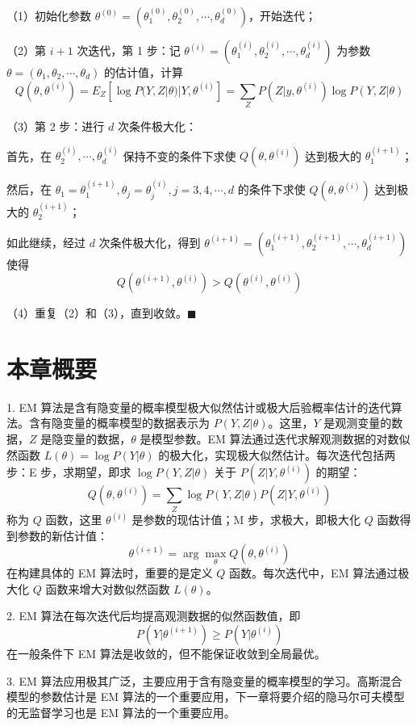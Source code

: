 \documentclass[UTF8, 12pt, fontset=fandol, oneside]{ctexart}
\begin{document}
（1）初始化参数 $\theta^{(0)}=(\theta_1^{(0)},\theta_2^{(0)},\cdots,\theta_d^{(0)})$，开始迭代；

（2）第 $i+1$ 次迭代，第 1 步：记 $\theta^{(i)}=(\theta_1^{(i)},\theta_2^{(i)},\cdots,\theta_d^{(i)})$ 为参数 $\theta=(\theta_1,\theta_2,\cdots,\theta_d)$ 的估计值，计算
\[
Q(\theta,\theta^{(i)})=E_Z[\log P(Y,Z|\theta)|Y,\theta^{(i)}]
=\sum_ZP(Z|y,\theta^{(i)})\log P(Y,Z|\theta)
\]

（3）第 2 步：进行 $d$ 次条件极大化：

首先，在 $\theta_2^{(i)},\cdots,\theta_d^{(i)}$ 保持不变的条件下求使 $Q(\theta,\theta^{(i)})$ 达到极大的 $\theta_1^{(i+1)}$；

然后，在 $\theta_1=\theta_1^{(i+1)},\theta_j=\theta_j^{(i)},j=3,4,\cdots,d$ 的条件下求使 $Q(\theta,\theta^{(i)})$ 达到极大的 $\theta_2^{(i+1)}$；

如此继续，经过 $d$ 次条件极大化，得到 $\theta^{(i+1)}=(\theta_1^{(i+1)},\theta_2^{(i+1)},\cdots,\theta_d^{(i+1)})$ 使得
\[
Q(\theta^{(i+1)},\theta^{(i)})>Q(\theta^{(i)},\theta^{(i)})
\]

（4）重复（2）和（3），直到收敛。\hfill$\blacksquare$

\section*{本章概要}

1. EM 算法是含有隐变量的概率模型极大似然估计或极大后验概率估计的迭代算法。含有隐变量的概率模型的数据表示为 $P(Y,Z|\theta)$。这里，$Y$ 是观测变量的数据，$Z$ 是隐变量的数据，$\theta$ 是模型参数。EM 算法通过迭代求解观测数据的对数似然函数 $L(\theta)=\log P(Y|\theta)$ 的极大化，实现极大似然估计。每次迭代包括两步：E 步，求期望，即求 $\log P(Y,Z|\theta)$ 关于 $P(Z|Y,\theta^{(i)})$ 的期望：
\[
Q(\theta,\theta^{(i)})=\sum_Z\log P(Y,Z|\theta)P(Z|Y,\theta^{(i)})
\]
称为 $Q$ 函数，这里 $\theta^{(i)}$ 是参数的现估计值；M 步，求极大，即极大化 $Q$ 函数得到参数的新估计值：
\[
\theta^{(i+1)}=\arg\max_\theta Q(\theta,\theta^{(i)})
\]
在构建具体的 EM 算法时，重要的是定义 $Q$ 函数。每次迭代中，EM 算法通过极大化 $Q$ 函数来增大对数似然函数 $L(\theta)$。

2. EM 算法在每次迭代后均提高观测数据的似然函数值，即
\[
P(Y|\theta^{(i+1)})\geqslant P(Y|\theta^{(i)})
\]
在一般条件下 EM 算法是收敛的，但不能保证收敛到全局最优。

3. EM 算法应用极其广泛，主要应用于含有隐变量的概率模型的学习。高斯混合模型的参数估计是 EM 算法的一个重要应用，下一章将要介绍的隐马尔可夫模型的无监督学习也是 EM 算法的一个重要应用。
\end{document}
